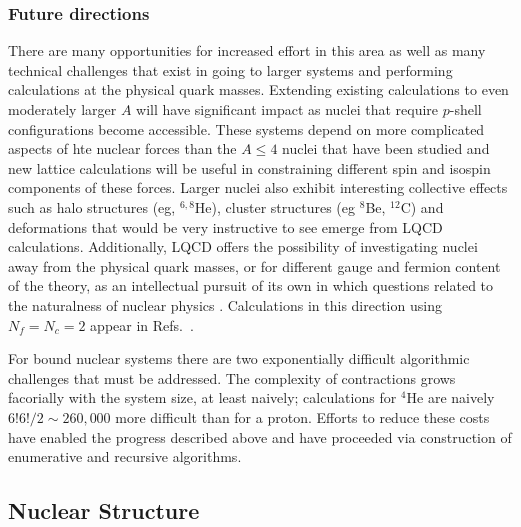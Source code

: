 \subsubsection{Future directions}
There are many opportunities for increased effort in this area as well as many technical challenges that exist in going to larger systems and performing calculations at the physical quark masses. 
Extending existing calculations to even moderately larger $A$ will have significant impact as nuclei that require $p$-shell configurations become accessible. These systems depend on more complicated aspects of hte nuclear forces than the $A\le4$ nuclei that have been studied and new lattice calculations will be useful in constraining different spin and isospin components of these forces. Larger nuclei also exhibit interesting collective effects such as halo structures (eg,  ${}^{6,8}$He), cluster structures (eg ${}^{8}$Be, ${}^{12}$C) and deformations that would be very instructive to see emerge from LQCD calculations. Additionally, LQCD offers the possibility of investigating nuclei away from the physical quark masses, or for different gauge and fermion content of the theory, as an intellectual pursuit of its own in which questions related to the naturalness of nuclear physics \cite{Orginos:2015aya}. Calculations in this direction using $N_f=N_c=2$ appear in Refs.~\cite{Detmold:2014qqa,Detmold:2014kba}.

For bound nuclear systems there are two exponentially difficult algorithmic challenges that must be addressed. The complexity of contractions grows 
facorially with the system size, at least naively; calculations for $^4$He are naively $6!6!/2\sim 260,000$ more difficult than for a proton. Efforts to reduce these costs have enabled the progress described above and have proceeded via construction of enumerative \cite{Doi:2012xd,Gunther:2013xj} and recursive \cite{Detmold:2012eu} algorithms. 


\subsection{Nuclear Structure}
\label{sec:nuclearstructure}

